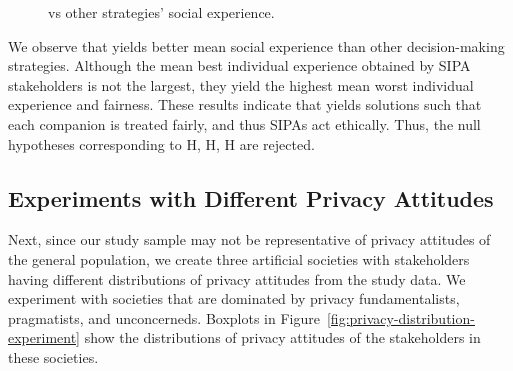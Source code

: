 \begin{figure}[!tb]
    \centering
    \caption[\frameworkAinur vs other strategies: Social experience]{\frameworkAinur vs other strategies' social experience.}
    \label{fig:weighted-experience-plot}
\end{figure}


We observe that \frameworkAinur yields better mean social experience than  other decision-making strategies. Although the mean best individual experience obtained by \frameworkAinur SIPA stakeholders is not the largest, they yield the highest mean worst individual experience and fairness. 
These results indicate that \frameworkAinur yields solutions such that each companion is treated fairly, and thus \frameworkAinur SIPAs act ethically. Thus, the null hypotheses corresponding to H, H, H are rejected.


\subsection{Experiments with Different Privacy Attitudes}
Next, since our study sample may not be representative of privacy attitudes of the general population, we create three artificial societies with stakeholders having different distributions of privacy attitudes from the study data. 
We experiment with societies that are dominated by privacy fundamentalists, pragmatists, and  unconcerneds. Boxplots in Figure~\ref{fig:privacy-distribution-experiment} show the distributions of privacy attitudes of the stakeholders in these societies. 

